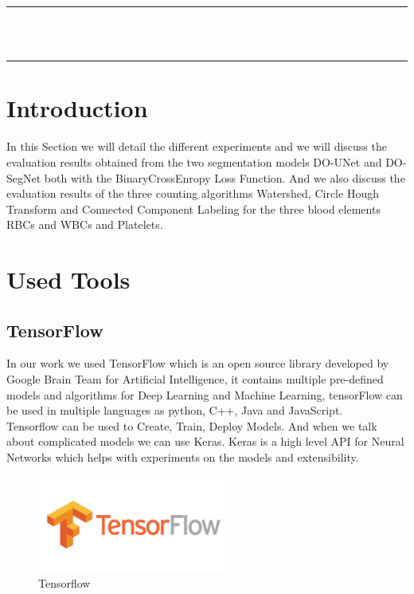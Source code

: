 \vspace*{\fill}
\begin{center}
    {\color{Black} \rule{\linewidth}{1.2mm} }\\
\vspace{0.25in}
{\centering{}}
\vspace{0.35in}\\
    {\color{Black} \rule{\linewidth}{1.2mm} }
\end{center}
\vspace*{\fill}
\setcounter{section}{0}

\newpage

\section{Introduction}
\vspace{0.2in}
\hspace{\parindent}
In this Section we will detail the different experiments and we will discuss the evaluation results obtained from the two segmentation models DO-UNet and DO-SegNet both with the BinaryCrossEnropy Loss Function. And we also discuss the evaluation results of the three counting algorithms Watershed, Circle Hough Transform and Connected Component Labeling for the three blood elements RBCs and WBCs and Platelets.

\section{Used Tools}
\subsection{TensorFlow}
\hspace{\parindent}
In our work we used TensorFlow which is an open source library developed by Google Brain Team for Artificial Intelligence, it contains multiple pre-defined models and algorithms for Deep Learning and Machine Learning, tensorFlow can be used in multiple languages as python, C++, Java and JavaScript.\\
Tensorflow can be used to Create, Train, Deploy Models. And when we talk about complicated models we can use Keras.
Keras is a high level API for Neural Networks which helps with experiments on the models and extensibility.

\begin{figure}[H]
    \centering
      \vspace{-0.1in}
        \centerline{\includegraphics[width = 2.5in]{../images/tensorflow.png}}
        \caption{Tensorflow}
        \label{Tensorflow}
    \end{figure}

